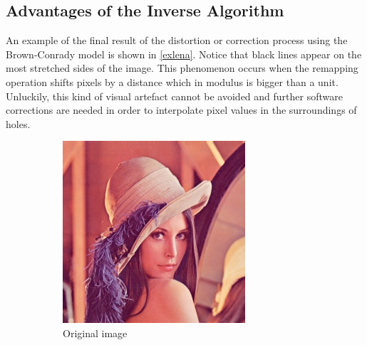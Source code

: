\documentclass[12pt]{article}
\begin{document}
\subsection{Advantages of the Inverse Algorithm}

An example of the final result of the distortion or correction process using the Brown-Conrady model is shown in \figurename{ \ref{exlena}}. Notice that black lines appear on the most stretched sides of the image. This phenomenon occurs when the remapping operation shifts pixels by a distance which in modulus is bigger than a unit. Unluckily, this kind of visual artefact cannot be avoided and further software corrections are needed in order to interpolate pixel values in the surroundings of holes.
%
\begin{figure}
	\centering
	\begin{subfigure}{0.30\linewidth}
		\centering
		\includegraphics[width=\linewidth]{./figures/lena.jpg}
		\caption{Original image}
		\label{lena01}
	\end{subfigure}\hfill
	\begin{subfigure}{0.30\linewidth}
		\centering

\end{subfigure}
\end{figure}
\end{document}
